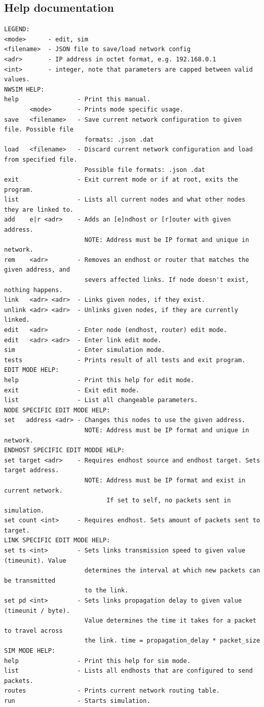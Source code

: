 \subsection{Help documentation} \label{sec:help}
\lstset{basicstyle=\scriptsize,numbers=no}
\begin{lstlisting}
LEGEND:
<mode>      - edit, sim
<filename>  - JSON file to save/load network config
<adr>       - IP address in octet format, e.g. 192.168.0.1
<int>       - integer, note that parameters are capped between valid values.
NWSIM HELP:
help                - Print this manual.
       <mode>       - Prints mode specific usage.
save   <filename>   - Save current network configuration to given file. Possible file
                      formats: .json .dat
load   <filename>   - Discard current network configuration and load from specified file.
                      Possible file formats: .json .dat
exit                - Exit current mode or if at root, exits the program.
list                - Lists all current nodes and what other nodes they are linked to.
add    e|r <adr>    - Adds an [e]ndhost or [r]outer with given address.
                      NOTE: Address must be IP format and unique in network.
rem    <adr>        - Removes an endhost or router that matches the given address, and
                      severs affected links. If node doesn't exist, nothing happens.
link   <adr> <adr>  - Links given nodes, if they exist.
unlink <adr> <adr>  - Unlinks given nodes, if they are currently linked.
edit   <adr>        - Enter node (endhost, router) edit mode.
edit   <adr> <adr>  - Enter link edit mode.
sim                 - Enter simulation mode.
tests               - Prints result of all tests and exit program.
EDIT MODE HELP:
help                - Print this help for edit mode.
exit                - Exit edit mode.
list                - List all changeable parameters.
NODE SPECIFIC EDIT MODE HELP:
set   address <adr> - Changes this nodes to use the given address.
                      NOTE: Address must be IP format and unique in network.
ENDHOST SPECIFIC EDIT MODDE HELP:
set target <adr>    - Requires endhost source and endhost target. Sets target address.
                      NOTE: Address must be IP format and exist in current network.
                            If set to self, no packets sent in simulation.
set count <int>     - Requires endhost. Sets amount of packets sent to target.
LINK SPECIFIC EDIT MODE HELP:
set ts <int>        - Sets links transmission speed to given value (timeunit). Value 
                      determines the interval at which new packets can be transmitted
                      to the link.
set pd <int>        - Sets links propagation delay to given value (timeunit / byte).
                      Value determines the time it takes for a packet to travel across
                      the link. time = propagation_delay * packet_size
SIM MODE HELP:
help                - Print this help for sim mode.
list                - Lists all endhosts that are configured to send packets.
routes              - Prints current network routing table.
run                 - Starts simulation.
\end{lstlisting}

